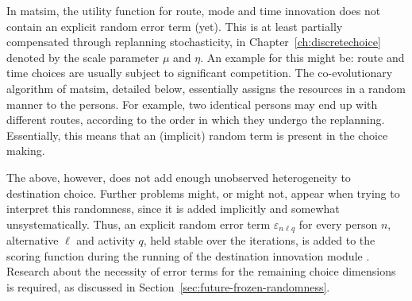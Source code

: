 In \gls{matsim}, the utility function for route, mode and time innovation does not contain an explicit random error term (yet). 
This is at least partially compensated through replanning stochasticity, in Chapter~\ref{ch:discretechoice} denoted by the scale parameter $\mu$ and $\eta$.
An example for this might be: route and time choices are usually subject to significant competition. 
The co-evolutionary algorithm of \gls{matsim}, detailed below, essentially assigns the resources in a random manner to the persons. 
For example, two identical persons may end up with different routes, according to the order in which they undergo the replanning. 
Essentially, this means that an (implicit) random term is present in the choice making.

The above, however, does not add enough unobserved heterogeneity to destination choice.
Further problems might, or might not, appear when trying to interpret this randomness, since it is added implicitly and somewhat unsystematically.
Thus, an explicit random error term $\varepsilon_{n\ell q}$ for every person $n$, alternative $\ell$ and activity $q$, held stable over the iterations, is added to the scoring function during the running of the destination innovation module
\citep[][]{Horni_PhDThesis_2013}. 
Research about the necessity of error terms for the remaining choice dimensions is required, as discussed in Section~\ref{sec:future-frozen-randomness}. %

